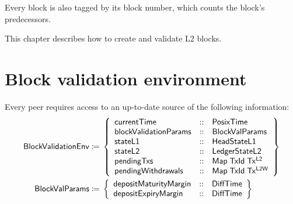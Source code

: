\documentclass[../hydrozoa.tex]{subfiles}
\begin{document}
Every block is also tagged by its block number, which counts the block's predecessors.

This chapter describes how to create and validate L2 blocks.

\section{Block validation environment}%
\label{h:l2-block-validation-environment}%

Every peer requires access to an up-to-date source of the following information:
\begin{equation*}
\begin{split}
  \mathsf{BlockValidationEnv} \coloneq&\; \left\{
    \begin{array}{lll}
      \mathsf{currentTime} &::& \mathsf{PosixTime} \\
      \mathsf{blockValidationParams} &::& \mathsf{BlockValParams} \\
      \mathsf{stateL1} &::& \mathsf{HeadStateL1} \\
      \mathsf{stateL2} &::& \mathsf{LedgerStateL2} \\
      \mathsf{pendingTxs} &::& \mathsf{Map} \; \mathsf{TxId} \; \mathsf{Tx^{L2}} \\
      \mathsf{pendingWithdrawals} &::& \mathsf{Map} \; \mathsf{TxId} \; \mathsf{Tx^{L2W}}
    \end{array}\right\} \\
  \mathsf{BlockValParams} \coloneq&\; \left\{
    \begin{array}{lll}
      \mathsf{depositMaturityMargin} &::& \mathsf{DiffTime} \\
      \mathsf{depositExpiryMargin} &::& \mathsf{DiffTime}
    \end{array}\right\}
\end{split}
\end{equation*}
\end{document}
